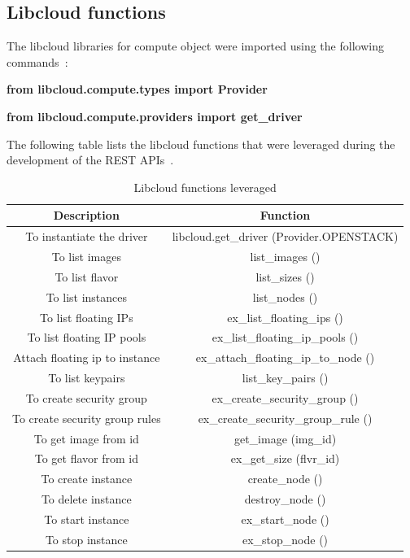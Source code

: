 \subsection{Libcloud functions}
The libcloud libraries for compute object were imported using the following
commands~\cite{hid-sp18-516-www-libcloud-functions}:

\textbf{from libcloud.compute.types import Provider}

\textbf{from libcloud.compute.providers import get\_driver} 

The following table lists the libcloud functions that were leveraged during 
the development of the REST 
APIs~\cite{hid-sp18-516-www-libcloud-functions}. 

\begin{table}[]
\centering
\caption{Libcloud functions leveraged}\label{tab:Description}
\begin{tabular}{*{2}{c}}
\toprule
Description                      & Function \\
\midrule
To instantiate the driver        & libcloud.get\_driver (Provider.OPENSTACK) \\
To list images                   & list\_images () \\
To list flavor                   & list\_sizes () \\
To list instances                & list\_nodes () \\
To list floating IPs             & ex\_list\_floating\_ips () \\
To list floating IP pools        & ex\_list\_floating\_ip\_pools () \\
Attach floating ip to instance   & ex\_attach\_floating\_ip\_to\_node () \\
To list keypairs                 & list\_key\_pairs () \\
To create security group         & ex\_create\_security\_group () \\
To create security group rules   & ex\_create\_security\_group\_rule () \\
To get image from id 	         & get\_image (img\_id) \\
To get flavor from id            & ex\_get\_size (flvr\_id) \\
To create instance               & create\_node () \\
To delete instance               & destroy\_node () \\
To start instance                & ex\_start\_node () \\
To stop instance                 & ex\_stop\_node () \\
\bottomrule
\end{tabular}
\end{table}

